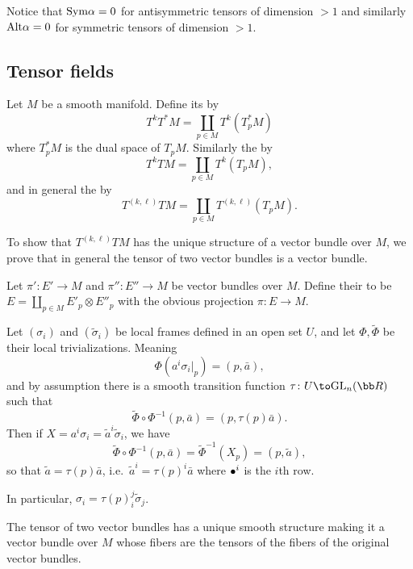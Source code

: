 Notice that ${\rm Sym}\alpha=0$ for antisymmetric tensors of dimension $>1$ and similarly ${\rm Alt}\alpha=0$ for symmetric tensors of dimension $>1$.

\subsection{Tensor fields}

\bdefn

    Let $M$ be a smooth manifold.
    Define its  by
    $$ T^kT^*M = \coprod_{p\in M}T^k(T^*_pM) $$
    where $T_p^*M$ is the dual space of $T_pM$.
    Similarly the  by
    $$ T^kTM = \coprod_{p\in M}T^k(T_pM) , $$
    and in general the  by
    $$ T^{(k,\ell)}TM = \coprod_{p\in M}T^{(k,\ell)}(T_pM) . $$

\edefn

To show that $T^{(k,\ell)}TM$ has the unique structure of a vector bundle over $M$, we prove that in general the tensor of two vector bundles is a vector bundle.

\bdefn

    Let $\pi'\colon E'\to M$ and $\pi''\colon E''\to M$ be vector bundles over $M$.
    Define their  to be $E=\coprod_{p\in M}E'_p\otimes E''_p$ with the obvious projection $\pi\colon E\to M$.

\edefn

Let $(\sigma_i)$ and $(\tilde\sigma_i)$ be local frames defined in an open set $U$, and let $\Phi,\tilde\Phi$ be their local trivializations.
Meaning
$$ \Phi(a^i\sigma_i|_p) = (p,\bar a), $$
and by assumption there is a smooth transition function $\tau\colon U\to\gl_n(\bR)$ such that
$$ \tilde\Phi\circ\Phi^{-1}(p,\bar a) = (p,\tau(p)\bar a) . $$
Then if $X=a^i\sigma_i=\tilde a^i\tilde\sigma_i$, we have
$$ \tilde\Phi\circ\Phi^{-1}(p,\bar a) = \tilde\Phi^{-1}(X_p) = (p,\tilde a), $$
so that $\tilde a=\tau(p)\bar a$, i.e.\ $\tilde a^i=\tau(p)^i\bar a$ where $\bullet^i$ is the $i$th row.

In particular, $\sigma_i=\tau(p)^j_i\tilde\sigma_j$.

\bprop

    The tensor of two vector bundles has a unique smooth structure making it a vector bundle over $M$ whose fibers are the tensors of the fibers of the original
    vector bundles.

\eprop

\bproof

